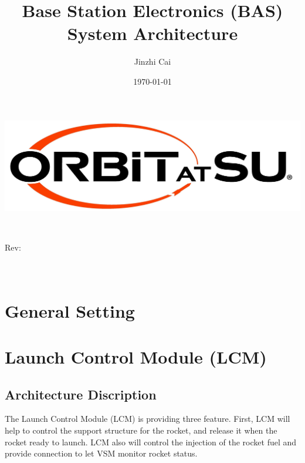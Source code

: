 \documentclass[12pt,article]{memoir}
\title{Base Station Electronics (BAS) System Architecture}
\author{Jinzhi Cai}
\date{\today}
\makeatletter
\newcommand\@itemcode{}
\newcommand\@revnumber{}
\makeatother
\begin{document}

\makeatletter
\includegraphics[width=\textwidth]{../logo.jpg}\\[4ex]
\begin{center}
	\bfseries \fontsize{50}{50}\selectfont  \@title \\[2ex]
	\LARGE  \@itemcode
\end{center}
\vfill
\begin{flushright}
	\LARGE Rev: \@revnumber\\
	\large \@author\\
	\large \@date\\[18ex]
\end{flushright}
\makeatother
\thispagestyle{empty}
\newpage

\tableofcontents*
\thispagestyle{fancy}
\newpage


\chapter{General Setting}
\chapter{Launch Control Module (LCM)}
\section{Architecture Discription}
The Launch Control Module (LCM) is providing three feature. First, LCM will help to control the support structure for the rocket, and release it when the rocket ready to launch. LCM also will control the injection of the rocket fuel and provide connection to let VSM monitor rocket status.
\end{document}
